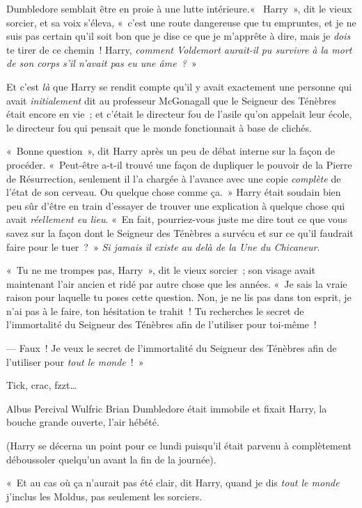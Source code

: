 Dumbledore semblait être en proie à une lutte intérieure.«~ Harry~», dit le vieux sorcier, et sa voix s'éleva, «~c'est une route dangereuse que tu empruntes, et je ne suis pas certain qu'il soit bon que je dise ce que je m'apprête à dire, mais je \emph{dois} te tirer de ce chemin~! Harry, \emph{comment Voldemort aurait-il pu survivre à la mort de son corps s'il n'avait pas eu une âme~?}~»

Et c'est \emph{là} que Harry se rendit compte qu'il y avait exactement une personne qui avait \emph{initialement} dit au professeur McGonagall que le Seigneur des Ténèbres était encore en vie~; et c'était le directeur fou de l'asile qu'on appelait leur école, le directeur fou qui pensait que le monde fonctionnait à base de clichés.

«~Bonne question~», dit Harry après un peu de débat interne sur la façon de procéder. «~Peut-être a-t-il trouvé une façon de dupliquer le pouvoir de la Pierre de Résurrection, seulement il l'a chargée à l'avance avec une copie \emph{complète} de l'état de son cerveau. Ou quelque chose comme ça.~» Harry était soudain bien peu sûr d'être en train d'essayer de trouver une explication à quelque chose qui avait \emph{réellement eu lieu}. «~En fait, pourriez-vous juste me dire tout ce que vous savez sur la façon dont le Seigneur des Ténèbres a survécu et sur ce qu'il faudrait faire pour le tuer~?~» \emph{Si jamais il existe au delà de la Une du Chicaneur}.

«~Tu ne me trompes pas, Harry~», dit le vieux sorcier~; son visage avait maintenant l'air ancien et ridé par autre chose que les années. «~Je sais la vraie raison pour laquelle tu poses cette question. Non, je ne lis pas dans ton esprit, je n'ai pas à le faire, ton hésitation te trahit~! Tu recherches le secret de l'immortalité du Seigneur des Ténèbres afin de l'utiliser pour toi-même~!

--- Faux~! Je veux le secret de l'immortalité du Seigneur des Ténèbres afin de l'utiliser pour \emph{tout le monde}~!~»

\later

Tick, crac, fzzt…

Albus Percival Wulfric Brian Dumbledore était immobile et fixait Harry, la bouche grande ouverte, l'air hébété.

(Harry se décerna un point pour ce lundi puisqu'il était parvenu à complètement déboussoler quelqu'un avant la fin de la journée).

«~Et au cas où ça n'aurait pas été clair, dit Harry, quand je dis \emph{tout le monde} j'inclus les Moldus, pas seulement les sorciers.


